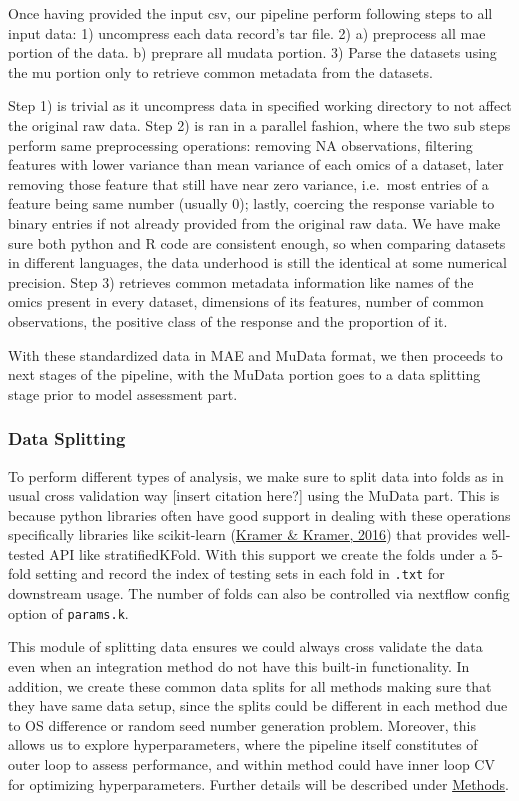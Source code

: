 \documentclass[
]{article}
\begin{document}
Once having provided the input csv, our pipeline perform following steps to all input data:
1) uncompress each data record's tar file. 2) a) preprocess all mae portion of the data. b) preprare all mudata portion. 3) Parse the datasets using the mu portion only to retrieve common metadata from the datasets.

Step 1) is trivial as it uncompress data in specified working directory to not affect the original raw data.
Step 2) is ran in a parallel fashion, where the two sub steps perform same preprocessing operations: removing NA observations, filtering features with lower variance than mean variance of each omics of a dataset, later removing those feature that still have near zero variance, i.e.~most entries of a feature being same number (usually 0); lastly, coercing the response variable to binary entries if not already provided from the original raw data.
We have make sure both python and R code are consistent enough, so when comparing datasets in different languages, the data underhood is still the identical at some numerical precision.
Step 3) retrieves common metadata information like names of the omics present in every dataset, dimensions of its features, number of common observations, the positive class of the response and the proportion of it.

With these standardized data in MAE and MuData format, we then proceeds to next stages of the pipeline, with the MuData portion goes to a data splitting stage prior to model assessment part.

\hypertarget{data-splitting}{%
\subsubsection{Data Splitting}\label{data-splitting}}

To perform different types of analysis, we make sure to split data into folds as in usual cross validation way {[}insert citation here?{]} using the MuData part. This is because python libraries often have good support in dealing with these operations specifically libraries like scikit-learn (\protect\hyperlink{ref-kramer2016scikit}{Kramer \& Kramer, 2016}) that provides well-tested API like stratifiedKFold. With this support we create the folds under a 5-fold setting and record the index of testing sets in each fold in \texttt{.txt} for downstream usage. The number of folds can also be controlled via nextflow config option of \texttt{params.k}.

This module of splitting data ensures we could always cross validate the data even when an integration method do not have this built-in functionality. In addition, we create these common data splits for all methods making sure that they have same data setup, since the splits could be different in each method due to OS difference or random seed number generation problem. Moreover, this allows us to explore hyperparameters, where the pipeline itself constitutes of outer loop to assess performance, and within method could have inner loop CV for optimizing hyperparameters. Further details will be described under \protect\hyperlink{methods}{Methods}.
\end{document}
